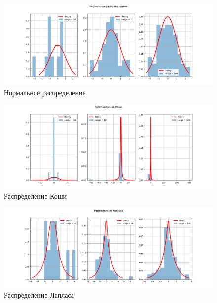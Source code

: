 \documentclass[12pt]{article}
\begin{document}
\begin{figure}[h!]
\begin{center}
\includegraphics[width=\textwidth]{normal.png} 
\caption{Нормальное распределение}
\end{center}
\end{figure}

\begin{figure}[h!]
\begin{center}
\includegraphics[width=\textwidth]{caushi.png}
\caption{Распределение Коши}
\end{center}
\end{figure}

\pagebreak

\begin{figure}[h!]
\begin{center}
\includegraphics[width=\textwidth]{laplace.png}
\caption{Распределение Лапласа}
\end{center}
\end{figure}
\end{document}
